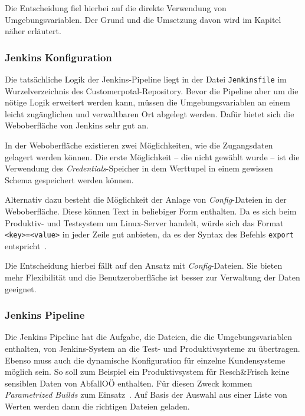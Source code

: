 Die Entscheidung fiel hierbei auf die direkte Verwendung von Umgebungsvariablen. Der Grund und die Umsetzung davon wird im Kapitel~ näher erläutert.

\subsubsection{Jenkins Konfiguration}

Die tatsächliche Logik der Jenkins-Pipeline liegt in der Datei \texttt{Jenkinsfile} im Wurzelverzeichnis des Customerpotal-Repository. Bevor die Pipeline aber um die nötige Logik erweitert werden kann, müssen die Umgebungsvariablen an einem leicht zugänglichen und verwaltbaren Ort abgelegt werden. Dafür bietet sich die Weboberfläche von Jenkins sehr gut an.

In der Weboberfläche existieren zwei Möglichkeiten, wie die Zugangsdaten gelagert werden können. Die erste Möglichkeit -- die nicht gewählt wurde -- ist die Verwendung des \textit{Credentials}-Speicher in dem Werttupel in einem gewissen Schema gespeichert werden können.

Alternativ dazu besteht die Möglichkeit der Anlage von \textit{Config}-Dateien in der Weboberfläche. Diese können Text in beliebiger Form enthalten. Da es sich beim Produktiv- und Testsystem um Linux-Server handelt, würde sich das Format \texttt{<key>=<value>} in jeder Zeile gut anbieten, da es der Syntax des Befehls \texttt{export} entspricht~\parencite{archwikienvfiles}.

Die Entscheidung hierbei fällt auf den Ansatz mit \textit{Config}-Dateien. Sie bieten mehr Flexibilität und die Benutzeroberfläche ist besser zur Verwaltung der Daten geeignet.

\subsubsection{Jenkins Pipeline}

Die Jenkins Pipeline hat die Aufgabe, die Dateien, die die Umgebungsvariablen enthalten, von Jenkins-System an die Test- und Produktivsysteme zu übertragen. Ebenso muss auch die dynamische Konfiguration für einzelne Kundensysteme möglich sein. So soll zum Beispiel ein Produktivsystem für Resch\&Frisch keine sensiblen Daten von AbfallOÖ enthalten. Für diesen Zweck kommen \textit{Parametrized Builds} zum Einsatz~\parencite{jenkinsparametrizedbuilds}. Auf Basis der Auswahl aus einer Liste von Werten werden dann die richtigen Dateien geladen.

